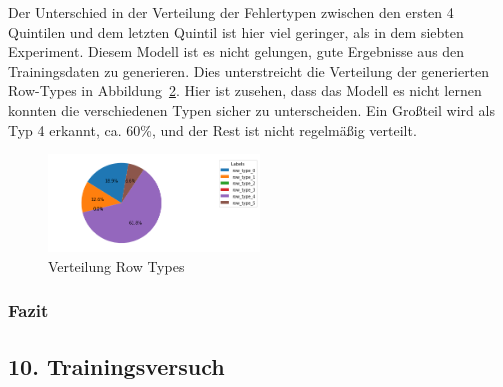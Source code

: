\documentclass[pdftex,a4paper,halfparskip, article]{scrartcl}
\begin{document}
\begin{figure}
\begin{minipage}{.5\textwidth}
  \label{fig:fehler_schlechteste20_bin12}
\end{minipage}%
\end{figure}

Der Unterschied in der Verteilung der Fehlertypen zwischen den ersten 4 Quintilen und dem letzten Quintil ist hier viel geringer, als in dem siebten Experiment. Diesem Modell ist es nicht gelungen, gute Ergebnisse aus den Trainingsdaten zu generieren. Dies unterstreicht die Verteilung der generierten Row-Types in Abbildung~\ref{fig:bin12_row_type}. Hier ist zusehen, dass das Modell es nicht lernen konnten die verschiedenen Typen sicher zu unterscheiden. Ein Großteil wird als Typ 4 erkannt, ca. 60\%, und der Rest ist nicht regelmäßig verteilt.

\begin{figure}[h]
\centering
\includegraphics[width=0.5\textwidth]{predictions_bin12_predicted_row_type_distribution}
\caption{Verteilung Row Types}
\label{fig:bin12_row_type}
\end{figure}

\subsubsection*{Fazit}





\subsection{10. Trainingsversuch}

\end{document}
